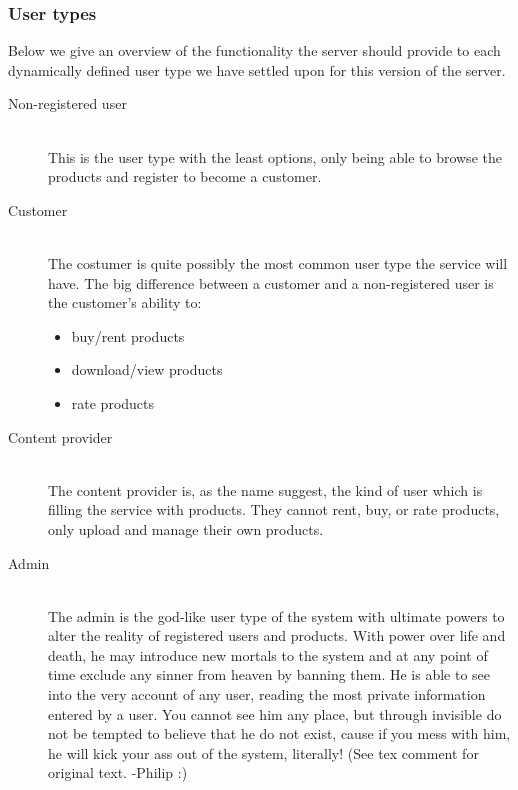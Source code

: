\subsubsection{User types}
\label{s_actor-goal-list}
Below we give an overview of the functionality the server should provide to each dynamically defined user type we have settled upon for this version of the server.

\begin{description}
	\item [Non-registered user] \hfill \\
		This is the user type with the least options, only being able to browse the products and register to become a customer.
	\item [Customer]  \hfill \\
		The costumer is quite possibly the most common user type the service will have. The big difference between a customer and a non-registered user is the customer's ability to:
		\begin{itemize}
			\item buy/rent products
			\item download/view products
			\item rate products
		\end{itemize}
	\item [Content provider] \hfill \\
		The content provider is, as the name suggest, the kind of user which is filling the service with products. They cannot rent, buy, or rate products, only upload and manage their own products.
	\item [Admin] \hfill \\
		The admin is the god-like user type of the system with ultimate powers to alter the reality of registered users and products. With power over life and death, he may introduce new mortals to the system and at any point of time exclude any sinner from heaven by banning them. He is able to see into the very account of any user, reading the most private information entered by a user. You cannot see him any place, but through invisible do not be tempted to believe that he do not exist, cause if you mess with him, he will kick your ass out of the system, literally! (See tex comment for original text. -Philip :)
\end{description}